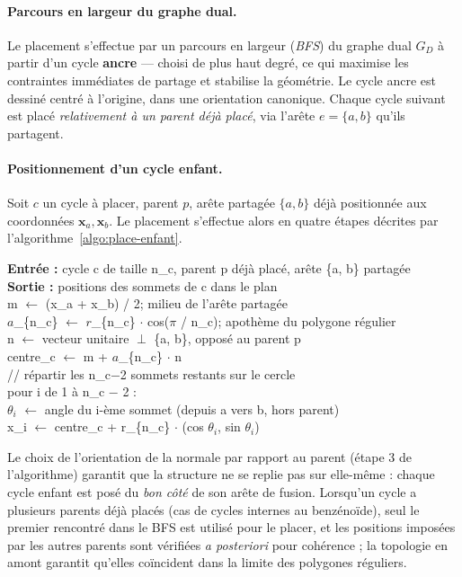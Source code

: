 \documentclass[11pt,a4paper]{article}
\newcommand{\GD}{\ensuremath{G_D}}                 %
\begin{document}
\paragraph{Parcours en largeur du graphe dual.}
Le placement s'effectue par un parcours en largeur (\emph{BFS}) du graphe
dual \GD{} à partir d'un cycle \textbf{ancre} --- choisi de plus haut degré,
ce qui maximise les contraintes immédiates de partage et stabilise la
géométrie. Le cycle ancre est dessiné centré à l'origine, dans une orientation
canonique. Chaque cycle suivant est placé \emph{relativement à un parent déjà
placé}, via l'arête $e = \{a, b\}$ qu'ils partagent.

\paragraph{Positionnement d'un cycle enfant.}
Soit $c$ un cycle à placer, parent $p$, arête partagée $\{a, b\}$ déjà
positionnée aux coordonnées $\mathbf{x}_a, \mathbf{x}_b$. Le placement
s'effectue alors en quatre étapes décrites par
l'algorithme~\ref{algo:place-enfant}.

\begin{algorithm}[h]
\small\ttfamily
\textbf{Entrée :} cycle c de taille n\_c, parent p déjà placé, arête \{a, b\} partagée\\
\textbf{Sortie :} positions des sommets de c dans le plan\\[0.3em]
m $\leftarrow$ (x\_a + x\_b) / 2\hfill {\rm ; milieu de l'arête partagée}\\
$a$\_\{n\_c\} $\leftarrow$ $r$\_\{n\_c\} $\cdot$ cos($\pi$ / n\_c)\hfill {\rm ; apothème du polygone régulier}\\
n $\leftarrow$ vecteur unitaire $\perp$ \{a, b\}, opposé au parent p\\
centre\_c $\leftarrow$ m + $a$\_\{n\_c\} $\cdot$ n\\[0.3em]
{\rm // répartir les n\_c$-$2 sommets restants sur le cercle}\\
pour i de 1 à n\_c $-$ 2 :\\
\phantom{xxxx} $\theta_i$ $\leftarrow$ angle du i-ème sommet (depuis a vers b, hors parent)\\
\phantom{xxxx} x\_i $\leftarrow$ centre\_c + r\_\{n\_c\} $\cdot$ (cos $\theta_i$, sin $\theta_i$)
\caption{Positionnement d'un cycle enfant relativement à son parent.}
\label{algo:place-enfant}
\end{algorithm}

Le choix de l'orientation de la normale par rapport au parent (étape 3
de l'algorithme) garantit que la structure ne se replie pas sur
elle-même : chaque cycle enfant est posé du \emph{bon côté} de son arête
de fusion. Lorsqu'un cycle a plusieurs parents déjà placés (cas de
cycles internes au benzénoïde), seul le premier rencontré dans le BFS
est utilisé pour le placer, et les positions imposées par les autres
parents sont vérifiées \emph{a posteriori} pour cohérence ; la topologie
en amont garantit qu'elles coïncident dans la limite des polygones
réguliers.
\end{document}
